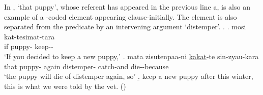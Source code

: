 In \Next,
 `that puppy',
whose referent has appeared in the previous line a,
is also an example of a -coded element appearing clause-initially.
The element is also separated from the predicate
by an intervening argument `distemper'.
%
\ex.
	\ag. mosi  kat-tesimat-tara \\
		if puppy- keep-- \\
		`If you decided to keep a new puppy,'
	\bg.   mata zisutenpaa-ni \ul{kakat}-te sin-zyau-kara \\
			that puppy- again distemper- catch-and die--because \\
			`the puppy will die of distemper again, so'
	\b. keep a new puppy after this winter, this is what we were told by the vet.
	\hfill{()}
%

